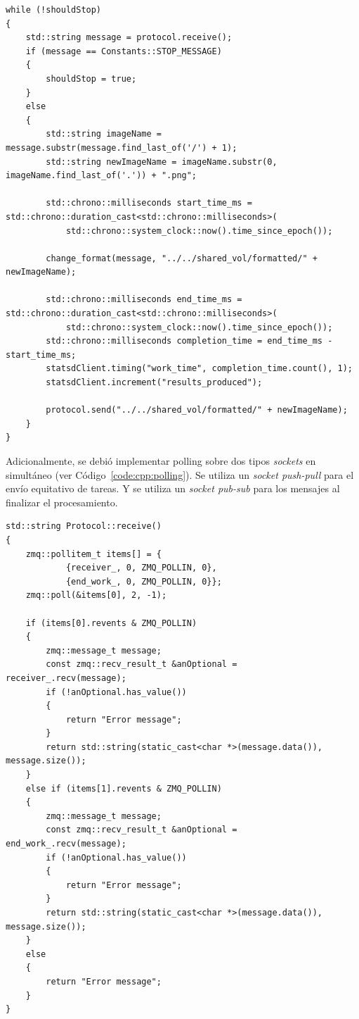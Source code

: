 \documentclass[11pt]{article}
\newcommand{\english}[1]{\textit{#1}}
\begin{document}
\begin{listing}[ht]
\begin{verbatim}
while (!shouldStop)
{
    std::string message = protocol.receive();
    if (message == Constants::STOP_MESSAGE)
    {
        shouldStop = true;
    }
    else
    {
        std::string imageName = message.substr(message.find_last_of('/') + 1);
        std::string newImageName = imageName.substr(0, imageName.find_last_of('.')) + ".png";

        std::chrono::milliseconds start_time_ms = std::chrono::duration_cast<std::chrono::milliseconds>(
            std::chrono::system_clock::now().time_since_epoch());

        change_format(message, "../../shared_vol/formatted/" + newImageName);

        std::chrono::milliseconds end_time_ms = std::chrono::duration_cast<std::chrono::milliseconds>(
            std::chrono::system_clock::now().time_since_epoch());
        std::chrono::milliseconds completion_time = end_time_ms - start_time_ms;
        statsdClient.timing("work_time", completion_time.count(), 1);
        statsdClient.increment("results_produced");

        protocol.send("../../shared_vol/formatted/" + newImageName);
    }
}
\end{verbatim}
\caption{Extracto de la función principal de un \english{format worker} en C++}
\label{code:cpp:format_worker}
\end{listing}

Adicionalmente, se debió implementar polling sobre dos tipos \english{sockets} en simultáneo (ver Código~\ref{code:cpp:polling}). Se utiliza un \english{socket push-pull} para el envío equitativo de tareas. Y se utiliza un \english{socket pub-sub} para los mensajes al finalizar el procesamiento.

\begin{listing}[ht]
\begin{verbatim}
std::string Protocol::receive()
{
    zmq::pollitem_t items[] = {
            {receiver_, 0, ZMQ_POLLIN, 0},
            {end_work_, 0, ZMQ_POLLIN, 0}};
    zmq::poll(&items[0], 2, -1);

    if (items[0].revents & ZMQ_POLLIN)
    {
        zmq::message_t message;
        const zmq::recv_result_t &anOptional = receiver_.recv(message);
        if (!anOptional.has_value())
        {
            return "Error message";
        }
        return std::string(static_cast<char *>(message.data()), message.size());
    }
    else if (items[1].revents & ZMQ_POLLIN)
    {
        zmq::message_t message;
        const zmq::recv_result_t &anOptional = end_work_.recv(message);
        if (!anOptional.has_value())
        {
            return "Error message";
        }
        return std::string(static_cast<char *>(message.data()), message.size());
    }
    else
    {
        return "Error message";
    }
}
\end{verbatim}
\caption{Extracto de la función principal de un \english{format worker} en C++}
\label{code:cpp:polling}
\end{listing}
\end{document}
